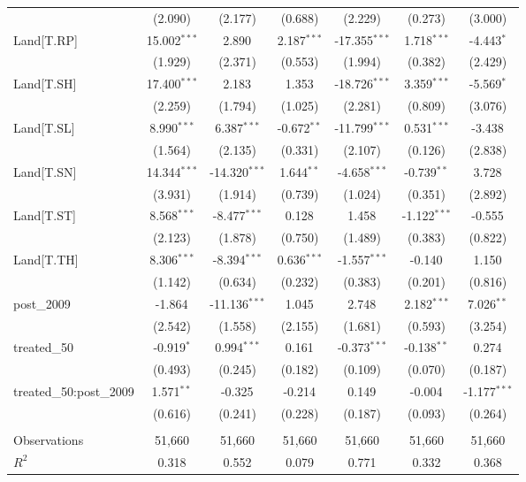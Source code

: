 \begin{table}[!htbp]
\begin{tabular}{@{\extracolsep{5pt}}lcccccc}
  & (2.090) & (2.177) & (0.688) & (2.229) & (0.273) & (3.000) \\
 Land[T.RP] & 15.002$^{***}$ & 2.890$^{}$ & 2.187$^{***}$ & -17.355$^{***}$ & 1.718$^{***}$ & -4.443$^{*}$ \\
  & (1.929) & (2.371) & (0.553) & (1.994) & (0.382) & (2.429) \\
 Land[T.SH] & 17.400$^{***}$ & 2.183$^{}$ & 1.353$^{}$ & -18.726$^{***}$ & 3.359$^{***}$ & -5.569$^{*}$ \\
  & (2.259) & (1.794) & (1.025) & (2.281) & (0.809) & (3.076) \\
 Land[T.SL] & 8.990$^{***}$ & 6.387$^{***}$ & -0.672$^{**}$ & -11.799$^{***}$ & 0.531$^{***}$ & -3.438$^{}$ \\
  & (1.564) & (2.135) & (0.331) & (2.107) & (0.126) & (2.838) \\
 Land[T.SN] & 14.344$^{***}$ & -14.320$^{***}$ & 1.644$^{**}$ & -4.658$^{***}$ & -0.739$^{**}$ & 3.728$^{}$ \\
  & (3.931) & (1.914) & (0.739) & (1.024) & (0.351) & (2.892) \\
 Land[T.ST] & 8.568$^{***}$ & -8.477$^{***}$ & 0.128$^{}$ & 1.458$^{}$ & -1.122$^{***}$ & -0.555$^{}$ \\
  & (2.123) & (1.878) & (0.750) & (1.489) & (0.383) & (0.822) \\
 Land[T.TH] & 8.306$^{***}$ & -8.394$^{***}$ & 0.636$^{***}$ & -1.557$^{***}$ & -0.140$^{}$ & 1.150$^{}$ \\
  & (1.142) & (0.634) & (0.232) & (0.383) & (0.201) & (0.816) \\
 post_2009 & -1.864$^{}$ & -11.136$^{***}$ & 1.045$^{}$ & 2.748$^{}$ & 2.182$^{***}$ & 7.026$^{**}$ \\
  & (2.542) & (1.558) & (2.155) & (1.681) & (0.593) & (3.254) \\
 treated_50 & -0.919$^{*}$ & 0.994$^{***}$ & 0.161$^{}$ & -0.373$^{***}$ & -0.138$^{**}$ & 0.274$^{}$ \\
  & (0.493) & (0.245) & (0.182) & (0.109) & (0.070) & (0.187) \\
 treated_50:post_2009 & 1.571$^{**}$ & -0.325$^{}$ & -0.214$^{}$ & 0.149$^{}$ & -0.004$^{}$ & -1.177$^{***}$ \\
  & (0.616) & (0.241) & (0.228) & (0.187) & (0.093) & (0.264) \\
\hline \\[-1.8ex]
 Observations & 51,660 & 51,660 & 51,660 & 51,660 & 51,660 & 51,660 \\
 $R^2$ & 0.318 & 0.552 & 0.079 & 0.771 & 0.332 & 0.368 \\

\end{tabular}
\end{table}
